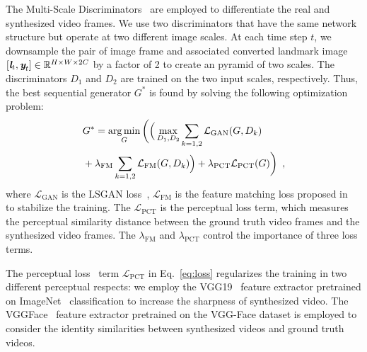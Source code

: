 \documentclass[runningheads]{llncs}
\DeclareMathOperator*{\argminA}{arg\,min} %
\def\mathbi#1{\textbf{\em #1}}
\providecommand{\CXu}[1]{\textcolor{red}{[{\bf #1}]}}
\begin{document}
The Multi-Scale Discriminators~\cite{wang2018high} are employed to differentiate the real and synthesized video frames. We use two discriminators that have the same network structure but operate at two different image scales. At each time step $t$, we downsample the pair of image frame and associated converted landmark image $[\mathbi{l}_{t}, \mathbi{y}_{t}] \in \mathbb{R}^{H\times W \times 2C} $ by a factor of 2 to create an pyramid of two scales. The discriminators $D_1$ and $D_2$ are trained on the two input scales, respectively. Thus, the best sequential generator $G^*$ is found by solving the following optimization problem:
\begin{equation}
\begin{aligned}
& G^* = \argminA_G\bigg{(} \Big{(} \max_{D_1,D_2}\sum_{k=1,2} \mathcal{L}_{\text{GAN}}(G,D_k) \\
& + \lambda_{\text{FM}} \sum_{k=1,2} \mathcal{L}_{\text{FM}}(G,D_k) \Big{)} + \lambda_{\text{PCT}} \mathcal{L}_{\text{PCT}}(G)\bigg{)}  \enspace,
\end{aligned}
\label{eq:loss}    
\end{equation}
where $\mathcal{L}_{\text{GAN}}$ is the LSGAN loss~\cite{mao2017least}, $\mathcal{L}_{\text{FM}}$ is the feature matching loss proposed in 
~\cite{wang2018high} to stabilize the training. The $\mathcal{L}_{\text{PCT}}$ is the perceptual loss term, which measures the perceptual similarity distance between the ground truth video frames and the synthesized video frames. The $\lambda_{\text{FM}}$ and $\lambda_{\text{PCT}}$ control the importance of three loss terms. 

The perceptual loss~\cite{johnson2016perceptual} term $\mathcal{L}_{\text{PCT}}$ in Eq.~\ref{eq:loss} regularizes the training in two different perceptual respects: we employ the VGG19~\cite{Simonyan15} feature extractor pretrained on ImageNet~\cite{deng2009imagenet} classification to increase the sharpness of synthesized video. The VGGFace~\cite{parkhi2015deep} feature extractor pretrained on the VGG-Face dataset is employed to consider the identity similarities between synthesized videos and ground truth videos.  



\end{document}
